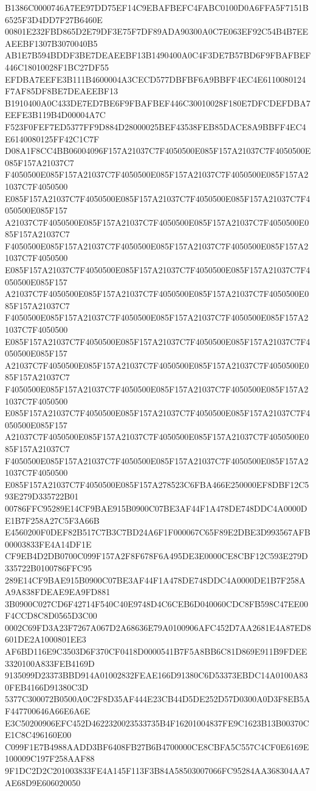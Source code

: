 {{B1386C0000746A7EE97DD75EF14C9EBAFBEFC4FABC0100D0A6FFA5F7151B6525F3D4DD7F27B6460E
00801E232FBD865D2E79DF3E75F7DF89ADA90300A0C7E063EF92C54B4B7EEAEEBF1307B3070040B5
AB1E7B594BDDF3BE7DEAEEBF13B1490400A0C4F3DE7B57BD6F9FBAFBEF446C18010028F1BC27DF55
EFDBA7EEFE3B111B4600004A3CECD577DBFBF6A9BBFF4EC4E6110080124F7AF85DF8BE7DEAEEBF13
B1910400A0C433DE7ED7BE6F9FBAFBEF446C30010028F180E7DFCDEFDBA7EEFE3B119B4D00004A7C
F523F0FEF7ED5377FF9D884D28000025BEF43538FEB85DACE8A9BBFF4EC4E6140080125FF42C1C7F
D08A1F8CC4BB06004096F157A21037C7F4050500E085F157A21037C7F4050500E085F157A21037C7
F4050500E085F157A21037C7F4050500E085F157A21037C7F4050500E085F157A21037C7F4050500
E085F157A21037C7F4050500E085F157A21037C7F4050500E085F157A21037C7F4050500E085F157
A21037C7F4050500E085F157A21037C7F4050500E085F157A21037C7F4050500E085F157A21037C7
F4050500E085F157A21037C7F4050500E085F157A21037C7F4050500E085F157A21037C7F4050500
E085F157A21037C7F4050500E085F157A21037C7F4050500E085F157A21037C7F4050500E085F157
A21037C7F4050500E085F157A21037C7F4050500E085F157A21037C7F4050500E085F157A21037C7
F4050500E085F157A21037C7F4050500E085F157A21037C7F4050500E085F157A21037C7F4050500
E085F157A21037C7F4050500E085F157A21037C7F4050500E085F157A21037C7F4050500E085F157
A21037C7F4050500E085F157A21037C7F4050500E085F157A21037C7F4050500E085F157A21037C7
F4050500E085F157A21037C7F4050500E085F157A21037C7F4050500E085F157A21037C7F4050500
E085F157A21037C7F4050500E085F157A21037C7F4050500E085F157A21037C7F4050500E085F157
A21037C7F4050500E085F157A21037C7F4050500E085F157A21037C7F4050500E085F157A21037C7
F4050500E085F157A21037C7F4050500E085F157A21037C7F4050500E085F157A21037C7F4050500
E085F157A21037C7F4050500E085F157A278523C6FBA466E250000EF8DBF12C593E279D335722B01
00786FFC95289E14CF9BAE915B0900C07BE3AF44F1A478DE748DDC4A0000DE1B7F258A27C5F3A66B
E4560200F0DEF82B517C7B3C7BD24A6F1F000067C65F89E2DBE3D993567AFB00003833FE4A14DF1E
CF9EB4D2DB0700C099F157A2F8F678F6A495DE3E0000CE8CBF12C593E279D335722B0100786FFC95
289E14CF9BAE915B0900C07BE3AF44F1A478DE748DDC4A0000DE1B7F258AA9A838FDEAE9EA9FD881
3B0900C027CD6F42714F540C40E9748D4C6CEB6D040060CDC8FB598C47EE00F4CCD8C8D0565D3C00
0002C69FD3A23F7267A067D2A68636E79A0100906AFC452D7AA2681E4A87ED8601DE2A1000801EE3
AF6BD116E9C3503D6F370CF0418D0000541B7F5A8BB6C81D869E911B9FDEE3320100A833FEB4169D
9135099D23373BBD914A01002832FEAE166D91380C6D53373EBDC14A0100A830FEB4166D91380C3D
5377C300072B0500A0C2F8D35AF444E23CB44D5DE252D57D0300A0D3F8EB5AF447700646A66E6A6E
E3C50200906EFC452D4622320023533735B4F16201004837FE9C1623B13B00370CE1C8C496160E00
C099F1E7B4988AADD3BF6408FB27B6B4700000CE8CBFA5C557C4CF0E6169E100009C197F258AAF88
9F1DC2D2C201003833FE4A145F113F3B84A58503007066FC95284AA368304AA7AE68D9E606020050
}}
